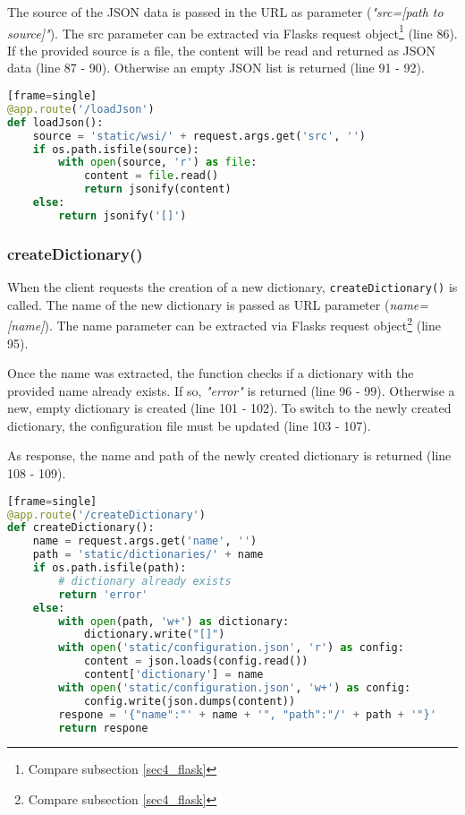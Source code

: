 The source of the JSON data is passed in the URL as parameter (\emph{"src=[path to source]"}). The src parameter can be extracted via Flasks request object\footnote{Compare subsection \ref{sec4_flask}} (line 86). If the provided source is a file, the content will be read and returned as JSON data (line 87 - 90). Otherwise an empty JSON list is returned (line 91 - 92).

\begin{lstlisting}[language=Python][frame=single]
@app.route('/loadJson')
def loadJson():
	source = 'static/wsi/' + request.args.get('src', '')
	if os.path.isfile(source):
		with open(source, 'r') as file:
			content = file.read()
			return jsonify(content)
	else:
		return jsonify('[]')
\end{lstlisting}


\subsubsection{createDictionary()}
When the client requests the creation of a new dictionary, \texttt{createDictionary()} is called. The name of the new dictionary is passed as URL parameter (\emph{name= [name]}). The name parameter can be extracted via Flasks request object\footnote{Compare subsection \ref{sec4_flask}} (line 95).

Once the name was extracted, the function checks if a dictionary with the provided name already exists. If so, \emph{"error"} is returned (line 96 - 99). Otherwise a new, empty dictionary is created (line 101 - 102). To switch to the newly created dictionary, the configuration file must be updated (line 103 - 107).

As response, the name and path of the newly created dictionary is returned (line 108 - 109).

\begin{lstlisting}[language=Python][frame=single]
@app.route('/createDictionary')
def createDictionary():
	name = request.args.get('name', '')
	path = 'static/dictionaries/' + name
	if os.path.isfile(path):
		# dictionary already exists
		return 'error'
	else:
		with open(path, 'w+') as dictionary:
			dictionary.write("[]")
		with open('static/configuration.json', 'r') as config:
			content = json.loads(config.read())
			content['dictionary'] = name
		with open('static/configuration.json', 'w+') as config:
			config.write(json.dumps(content))
		respone = '{"name":"' + name + '", "path":"/' + path + '"}'
		return respone
\end{lstlisting}


